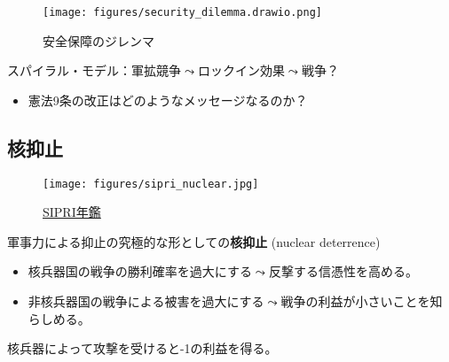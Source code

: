 \documentclass[
  xelatex,
  ja=standard]{bxjsarticle}
\providecommand{\tightlist}{%
  \setlength{\itemsep}{0pt}\setlength{\parskip}{0pt}}\usepackage{longtable,booktabs,array}
\begin{document}
\begin{figure}[htpb]

{\centering \texttt{[image: figures/security\_dilemma.drawio.png]}

}

\caption{安全保障のジレンマ}

\end{figure}

スパイラル・モデル：軍拡競争\(\leadsto\)ロックイン効果\(\leadsto\)戦争？

\begin{itemize}
\tightlist
\item
  憲法9条の改正はどのようなメッセージなるのか？
\end{itemize}

\hypertarget{ux6838ux6291ux6b62}{%
\subsection{核抑止}\label{ux6838ux6291ux6b62}}

\begin{figure}[htpb]

{\centering \texttt{[image: figures/sipri\_nuclear.jpg]}

}

\caption{\href{https://www.sipri.org/yearbook/2022/10}{SIPRI年鑑}}

\end{figure}

軍事力による抑止の究極的な形としての\textbf{核抑止} (nuclear deterrence)

\begin{itemize}
\tightlist
\item
  核兵器国の戦争の勝利確率を過大にする\(\leadsto\)反撃する信憑性を高める。
\item
  非核兵器国の戦争による被害を過大にする\(\leadsto\)戦争の利益が小さいことを知らしめる。
\end{itemize}

\begin{tcolorbox}[enhanced jigsaw, opacityback=0, leftrule=.75mm, toptitle=1mm, colframe=quarto-callout-tip-color-frame, arc=.35mm, bottomrule=.15mm, coltitle=black, bottomtitle=1mm, colbacktitle=quarto-callout-tip-color!10!white, titlerule=0mm, breakable, title=\textcolor{quarto-callout-tip-color}{\faLightbulb}\hspace{0.5em}{核による非核兵器国への抑止}, left=2mm, rightrule=.15mm, toprule=.15mm, opacitybacktitle=0.6, colback=white]

核兵器によって攻撃を受けると-1の利益を得る。

\end{tcolorbox}
\end{document}
